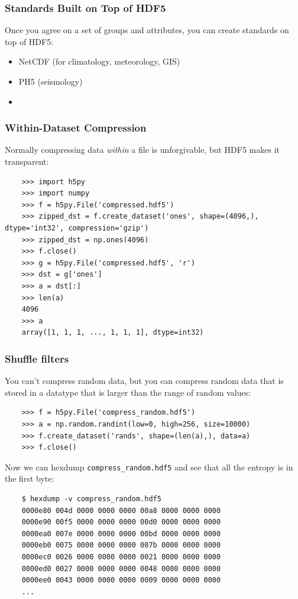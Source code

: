 \documentclass[9pt]{beamer}
\begin{document}
\begin{frame}[fragile]
  \frametitle{Standards Built on Top of HDF5}
  Once you agree on a set of groups and attributes, you can create standards on top of HDF5:
  \begin{itemize}
  \item NetCDF (for climatology, meteorology, GIS)
  \item PH5 (seismology)
  \item 
  \end{itemize}
\end{frame}

\begin{frame}[fragile]
  \frametitle{Within-Dataset Compression}
  Normally compressing data \emph{within} a file is unforgivable, but HDF5 makes it transparent:
  \begin{verbatim}
    >>> import h5py
    >>> import numpy
    >>> f = h5py.File('compressed.hdf5')
    >>> zipped_dst = f.create_dataset('ones', shape=(4096,), dtype='int32', compression='gzip')
    >>> zipped_dst = np.ones(4096)
    >>> f.close()
    >>> g = h5py.File('compressed.hdf5', 'r')
    >>> dst = g['ones']
    >>> a = dst[:]
    >>> len(a)
    4096
    >>> a
    array([1, 1, 1, ..., 1, 1, 1], dtype=int32)
  \end{verbatim}
\end{frame}

\begin{frame}[fragile]
  \frametitle{Shuffle filters}
  You can't compress random data, but you can compress random data that is stored in a datatype that is larger than the range of random values:
  \begin{verbatim}
    >>> f = h5py.File('compress_random.hdf5')
    >>> a = np.random.randint(low=0, high=256, size=10000)
    >>> f.create_dataset('rands', shape=(len(a),), data=a)
    >>> f.close()
  \end{verbatim}
  Now we can hexdump \texttt{compress\_random.hdf5} and see that all the entropy is in the first byte:
  \begin{verbatim}
    $ hexdump -v compress_random.hdf5
    0000e80 004d 0000 0000 0000 00a8 0000 0000 0000
    0000e90 00f5 0000 0000 0000 00d0 0000 0000 0000
    0000ea0 007e 0000 0000 0000 00bd 0000 0000 0000
    0000eb0 0075 0000 0000 0000 007b 0000 0000 0000
    0000ec0 0026 0000 0000 0000 0021 0000 0000 0000
    0000ed0 0027 0000 0000 0000 0048 0000 0000 0000
    0000ee0 0043 0000 0000 0000 0009 0000 0000 0000
    ...
  \end{verbatim}
\end{frame}
\end{document}
